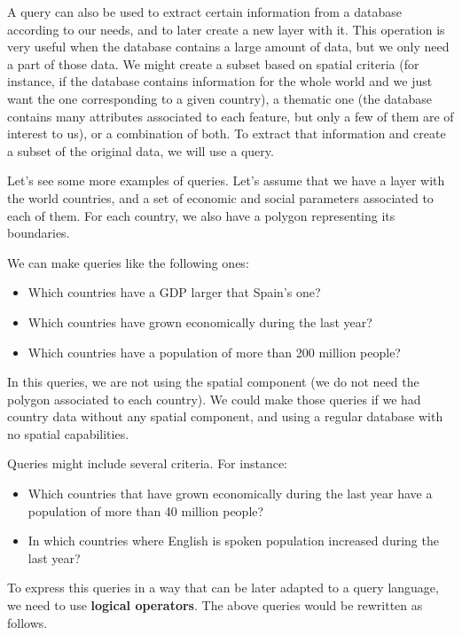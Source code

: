 A query can also be used to extract certain information from a database according to our needs, and to later create a new layer with it. This operation is very useful when the database contains a large amount of data, but we only need a part of those data. We might create a subset based on spatial criteria (for instance, if the database contains information for the whole world and we just want the one corresponding to a given country), a thematic one (the database contains many attributes associated to each feature, but only a few of them are of interest to us), or a combination of both. To extract that information and create a subset of the original data, we will use a query.

Let's see some more examples of queries. Let's assume that we have a layer with the world countries, and a set of economic and social parameters associated to each of them. For each country, we also have a polygon representing its boundaries.

We can make queries like the following ones:

\begin{itemize}
 \item Which countries have a GDP larger that Spain's one?
\item Which countries have grown economically during the last year?
\item Which countries have a population of more than 200 million people? 
\end{itemize}

In this queries, we are not using the spatial component (we do not need the polygon associated to each country). We could make those queries if we had country data without any spatial component, and using a regular database with no spatial capabilities.

Queries might include several criteria. For instance:

\begin{itemize}
 \item Which countries that have grown economically during the last year have a population of more than 40 million people?
\item In which countries where English is spoken population increased during the last year?
\end{itemize}

To express this queries in a way that can be later adapted to a query language, we need to use \textbf{logical operators}. The above queries would be rewritten as follows.

